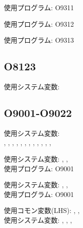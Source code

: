 \begin{hosoku}\small
使用プログラム: O9311
\end{hosoku}

\begin{hosoku}\small
使用プログラム: O9312
\end{hosoku}

\begin{hosoku}\small
使用プログラム: O9313
\end{hosoku}


\subsection{O8123}
\begin{hosoku}\small
使用システム変数: 
\end{hosoku}

\subsection{O9001-O9022}
\begin{hosoku}\small
使用システム変数:\\
, , , , , , , , , , , , 
\end{hosoku}

\begin{hosoku}\small
使用システム変数: , , \\
使用プログラム: O9001
\end{hosoku}

\begin{hosoku}\small
使用システム変数: , , \\
使用プログラム: O9001
\end{hosoku}

\begin{hosoku}\small
使用コモン変数(LHS): , , \\
使用システム変数: , , , 
\end{hosoku}

